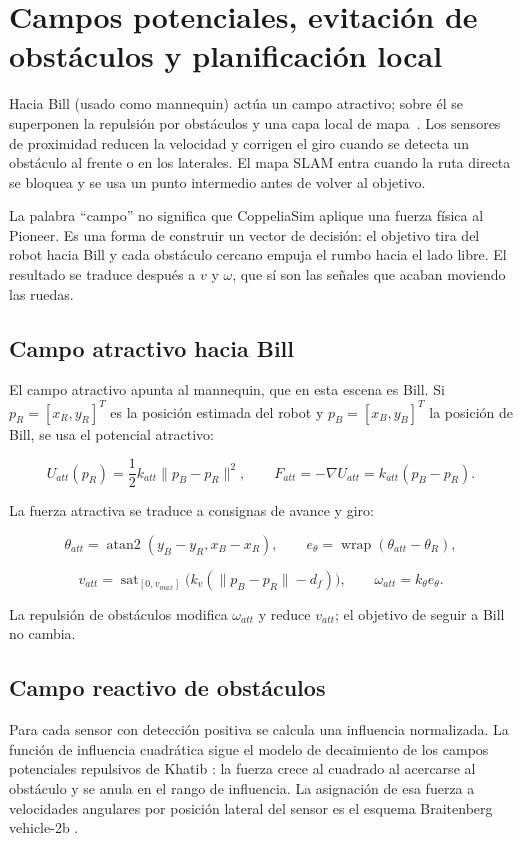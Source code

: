 \chapter{Campos potenciales, evitación de obstáculos y planificación local}
\label{ch:campos-potenciales}

Hacia Bill (usado como mannequin) actúa un campo atractivo; sobre él se
superponen la repulsión por obstáculos y una capa local de mapa~\cite{lavalle2006}. Los sensores de
proximidad reducen la velocidad y corrigen el giro cuando se detecta un obstáculo al frente
o en los laterales. El mapa SLAM entra cuando la ruta directa se bloquea y se usa
un punto intermedio antes de volver al objetivo.

La palabra ``campo'' no significa que CoppeliaSim aplique una fuerza física al
Pioneer. Es una forma de construir un vector de decisión: el objetivo tira del
robot hacia Bill y cada obstáculo cercano empuja el rumbo hacia el lado libre. El
resultado se traduce después a \(v\) y \(\omega\), que sí son las señales que
acaban moviendo las ruedas.

\section{Campo atractivo hacia Bill}

El campo atractivo apunta al mannequin, que en esta escena es Bill. Si
\(p_R=[x_R,y_R]^T\) es la posición estimada del robot y \(p_B=[x_B,y_B]^T\) la
posición de Bill, se usa el potencial atractivo:

\[
U_{att}(p_R)=\frac{1}{2}k_{att}\|p_B-p_R\|^2,
\qquad
F_{att}=-\nabla U_{att}=k_{att}(p_B-p_R).
\]

La fuerza atractiva se traduce a consignas de avance y giro:

\[
\theta_{att}=\operatorname{atan2}(y_B-y_R,x_B-x_R),
\qquad
e_\theta=\operatorname{wrap}(\theta_{att}-\theta_R),
\]

\[
v_{att}=\operatorname{sat}_{[0,v_{max}]}\bigl(k_v(\|p_B-p_R\|-d_f)\bigr),
\qquad
\omega_{att}=k_\theta e_\theta .
\]

La repulsión de obstáculos modifica \(\omega_{att}\) y reduce \(v_{att}\); el
objetivo de seguir a Bill no cambia.

\section{Campo reactivo de obstáculos}

Para cada sensor con detección positiva se calcula una influencia normalizada.
La función de influencia cuadrática sigue el modelo de decaimiento de los
campos potenciales repulsivos de Khatib \cite{khatib1986}: la fuerza crece al
cuadrado al acercarse al obstáculo y se anula en el rango de influencia.
La asignación de esa fuerza a velocidades angulares por posición lateral del
sensor es el esquema Braitenberg vehicle-2b \cite{braitenberg1984}.

